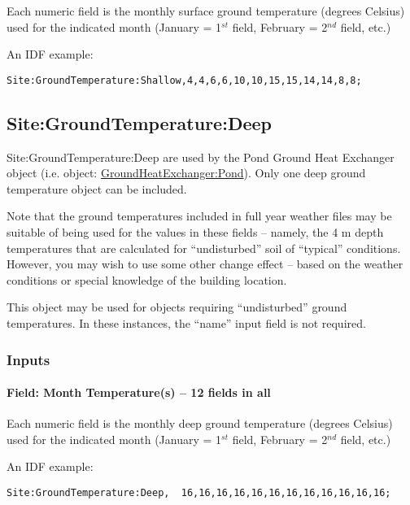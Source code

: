 Each numeric field is the monthly surface ground temperature (degrees Celsius) used for the indicated month (January = 1\(^{st}\) field, February = 2\(^{nd}\) field, etc.)

An IDF example:

\begin{lstlisting}
Site:GroundTemperature:Shallow,4,4,6,6,10,10,15,15,14,14,8,8;
\end{lstlisting}

\subsection{Site:GroundTemperature:Deep}\label{sitegroundtemperaturedeep}

Site:GroundTemperature:Deep are used by the Pond Ground Heat Exchanger object (i.e. object: \hyperref[groundheatexchangerpond]{GroundHeatExchanger:Pond}). Only one deep ground temperature object can be included.

\begin{callout}
Note that the ground temperatures included in full year weather files may be suitable of being used for the values in these fields -- namely, the 4 m depth temperatures that are calculated for ``undisturbed'' soil of ``typical'' conditions. However, you may wish to use some other change effect -- based on the weather conditions or special knowledge of the building location.
\end{callout}

This object may be used for objects requiring ``undisturbed'' ground temperatures. In these instances, the ``name'' input field is not required.

\subsubsection{Inputs}\label{inputs-13-007}

\paragraph{Field: Month Temperature(s) -- 12 fields in all}\label{field-month-temperatures-12-fields-in-all-2}

Each numeric field is the monthly deep ground temperature (degrees Celsius) used for the indicated month (January = 1\(^{st}\) field, February = 2\(^{nd}\) field, etc.)

An IDF example:

\begin{lstlisting}
Site:GroundTemperature:Deep,  16,16,16,16,16,16,16,16,16,16,16,16;
\end{lstlisting}


